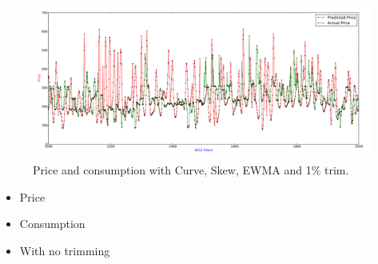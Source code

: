 \begin{figure}[H]
\centering
\includegraphics[width=\linewidth,natwidth=898,natheight=587]{billeder/PriceExperimentalAnalysis/X3_Price_Consump_Worst.png}
\caption{Price and consumption with Curve, Skew, EWMA and 1\% trim.}
\label{fig:X3_Price_Consump_Worst}
\end{figure}

\begin{itemize}
	\item Price
	\item Consumption
	\item With no trimming
\end{itemize}

